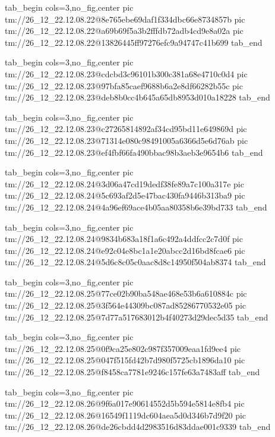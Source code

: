  
 
 
 
 

\qqSecCmtScr


\ifcmt
  tab_begin cols=3,no_fig,center
    pic tm://26_12_22.12.08.22@8e765ebe69daf1f334dbc66e8734857b
    pic tm://26_12_22.12.08.22@a69b69f5a3b2fffdb72adb4cd9e8a02a
    pic tm://26_12_22.12.08.22@13826445ff97276efc9a94747c41b699
  tab_end
\fi


\ifcmt
  tab_begin cols=3,no_fig,center
    pic tm://26_12_22.12.08.23@cdcbd3c96101b300c381a68e4710c0d4
    pic tm://26_12_22.12.08.23@97bfa85caef9688b6a2e8df66282b55c
    pic tm://26_12_22.12.08.23@deb8b0cc4b645a65db8953d010a18228
  tab_end
\fi


\ifcmt
  tab_begin cols=3,no_fig,center
    pic tm://26_12_22.12.08.23@c27265814892af34cd95bd11e649869d
    pic tm://26_12_22.12.08.23@71314e080c98491005a6366d5e6d76ab
    pic tm://26_12_22.12.08.23@ef4fbf66fa490bbac98b3aeb3e9654b6
  tab_end
\fi


\ifcmt
  tab_begin cols=3,no_fig,center
    pic tm://26_12_22.12.08.24@3d06a47cd19dedf38fe89a7c100a317e
    pic tm://26_12_22.12.08.24@5c693af2d5e47bac430fa9446b313ba9
    pic tm://26_12_22.12.08.24@4a96ef69ace4b05aa80358b6e39bd733
  tab_end
\fi


\ifcmt
  tab_begin cols=3,no_fig,center
    pic tm://26_12_22.12.08.24@9834b683a18f1a6c492a4ddfcc2c7d0f
    pic tm://26_12_22.12.08.24@e92c04e8bc1a1e20abcc2d16bd8fcae6
    pic tm://26_12_22.12.08.24@5d6c8c05c0aac8d8c14950f504ab8374
  tab_end
\fi


\ifcmt
  tab_begin cols=3,no_fig,center
    pic tm://26_12_22.12.08.25@77ce02b90ba548ae468e53b6a610884c
    pic tm://26_12_22.12.08.25@3f564e44309bc087ad85286770532e05
    pic tm://26_12_22.12.08.25@7d77a517683012b4f40273d29dec5d35
  tab_end
\fi


\ifcmt
  tab_begin cols=3,no_fig,center
    pic tm://26_12_22.12.08.25@0f9ca25e802c987f357009eaa1fd9ee4
    pic tm://26_12_22.12.08.25@047f515fd42b7d980f5725cb1896da10
    pic tm://26_12_22.12.08.25@f8458ca7781e9246c157fe63a7483aff
  tab_end
\fi


\ifcmt
  tab_begin cols=3,no_fig,center
    pic tm://26_12_22.12.08.26@9f6a017e90614552d5b594e5814e8fb4
    pic tm://26_12_22.12.08.26@16549f1119dc604aea5d0d346b7d9f20
    pic tm://26_12_22.12.08.26@de26cbdd4d2983516d83ddae001c9339
  tab_end
\fi


